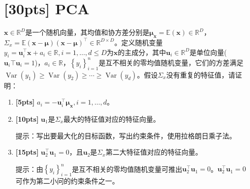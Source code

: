 \documentclass[a4paper,UTF8]{article}
\theoremstyle{definition}
\begin{document}
\newpage

\section{[30pts] PCA}
$\boldsymbol{x} \in \mathbb{R}^{D}$是一个随机向量，其均值和协方差分别是$\boldsymbol{\mu}_{\boldsymbol{x}}=\mathbb{E}(\boldsymbol{x}) \in \mathbb{R}^{D}$，$\Sigma_{x}=\mathbb{E}(\boldsymbol{x}-\boldsymbol{\mu})(\boldsymbol{x}-\boldsymbol{\mu})^{\top} \in \mathbb{R}^{D \times D}$。定义随机变量$y_{i}=\boldsymbol{u}_{i}^{\top} \boldsymbol{x}+a_{i} \in \mathbb{R}, i=1, \ldots, d \leq D$为$\boldsymbol{x}$的主成分，其中$\boldsymbol{u}_{i} \in \mathbb{R}^{D}$是单位向量($\boldsymbol{u}_i \top \boldsymbol{u}_i = 1$)，$a_{i} \in \mathbb{R}$，$\left\{y_{i}\right\}_{i=1}^{n}$是互不相关的零均值随机变量，它们的方差满足$\operatorname{Var}\left(y_{1}\right) \geq \operatorname{Var}\left(y_{2}\right) \geq \cdots \geq \operatorname{Var}\left(y_{d}\right)$。假设$\Sigma_{x}$没有重复的特征值，请证明：
\begin{enumerate}
	\item \textbf{[5pts]} $a_{i}=-\boldsymbol{u}_{i}^{\top} \boldsymbol{\mu}_{\boldsymbol{x}}, i=1, \ldots, d$。
	\item \textbf{[10pts]} $\boldsymbol{u}_{1}$是$\Sigma_{x}$最大的特征值对应的特征向量。

	      提示：写出要最大化的目标函数，写出约束条件，使用拉格朗日乘子法。

	\item \textbf{[15pts]} $\boldsymbol{u}_{2}^{\top} \boldsymbol{u}_{1}=0$，且$\boldsymbol{u}_{2}$是$\Sigma_{x}$第二大特征值对应的特征向量。

	      提示：由$\left\{y_{i}\right\}_{i=1}^{n}$是互不相关的零均值随机变量可推出$\boldsymbol{u}_{2}^{\top} \boldsymbol{u}_{1}=0$。$\boldsymbol{u}_{2}^{\top} \boldsymbol{u}_{1}=0$ 可作为第二小问的约束条件之一。

\end{enumerate}
\end{document}
